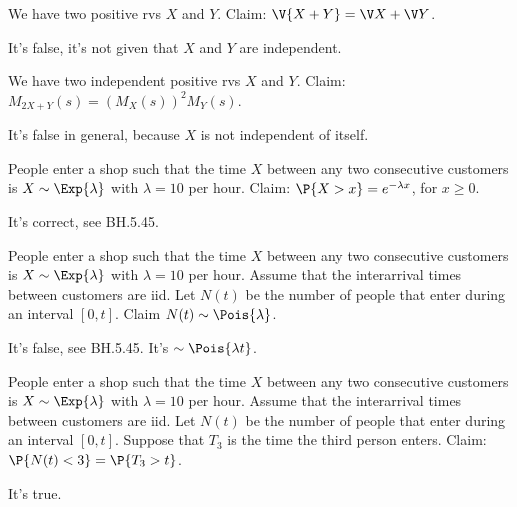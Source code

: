 \documentclass[tf-tutorial-all.tex]{subfiles}
\begin{document}
\begin{truefalse}
We have two positive rvs $X$ and $Y$. Claim: $\V{X+Y} = \V X + \V Y$.
\begin{solution}
It's false, it's not given that $X$  and $Y$ are independent.
\end{solution}
\end{truefalse}



\begin{truefalse}
We have two independent positive rvs $X$ and $Y$. Claim: $M_{2X+Y}(s)  = (M_{X}(s))^{2} M_{Y}(s)$.
\begin{solution}
It's false in general, because $X$ is not independent of itself.
\end{solution}
\end{truefalse}




\begin{truefalse}
People enter a shop such that the time $X$ between  any two consecutive customers is $X\sim \Exp{\lambda}$ with $\lambda=10$ per hour. Claim: $\P{X > x} = e^{-\lambda x}$, for $x\geq 0$.
\begin{solution}
It's correct, see BH.5.45.
\end{solution}
\end{truefalse}

\begin{truefalse}
People enter a shop such that the time $X$ between any two consecutive customers is $X\sim \Exp{\lambda}$ with $\lambda=10$ per hour.
Assume that the interarrival times between customers are iid.
Let $N(t)$ be the number of people that enter during an interval $[0,t]$.
Claim $N(t) \sim \Pois{\lambda}$.
\begin{solution}
It's false, see BH.5.45. It's $\sim \Pois{\lambda t}$.
\end{solution}
\end{truefalse}

\begin{truefalse}
People enter a shop such that the time $X$ between any two consecutive customers is $X\sim \Exp{\lambda}$ with $\lambda=10$ per hour.
Assume that the interarrival times between customers are iid.
Let $N(t)$ be the number of people that enter during an interval $[0,t]$.
Suppose that $T_{3}$ is the time the third person enters.
Claim: $\P{N(t) <3} = \P{T_{3}>t}$.
\begin{solution}
It's true.
\end{solution}
\end{truefalse}
\end{document}
